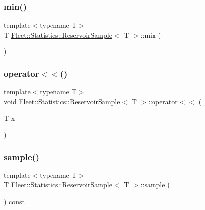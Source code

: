 \subsubsection{\texorpdfstring{min()}{min()}}
{\footnotesize\ttfamily template$<$typename T$>$ \\
T \hyperlink{class_fleet_1_1_statistics_1_1_reservoir_sample}{Fleet\+::\+Statistics\+::\+Reservoir\+Sample}$<$ T $>$\+::min (\begin{DoxyParamCaption}{ }\end{DoxyParamCaption})\hspace{0.3cm}{\ttfamily [inline]}}

\mbox{\label{class_fleet_1_1_statistics_1_1_reservoir_sample_ad6e4d50ef1acefce7f5d66013720c1ef}} 
\subsubsection{\texorpdfstring{operator$<$$<$()}{operator<<()}}
{\footnotesize\ttfamily template$<$typename T$>$ \\
void \hyperlink{class_fleet_1_1_statistics_1_1_reservoir_sample}{Fleet\+::\+Statistics\+::\+Reservoir\+Sample}$<$ T $>$\+::operator$<$$<$ (\begin{DoxyParamCaption}\item[{T}]{x }\end{DoxyParamCaption})\hspace{0.3cm}{\ttfamily [inline]}}

\mbox{\label{class_fleet_1_1_statistics_1_1_reservoir_sample_a1b66a8f27512ebd6a48370621a43db87}} 
\subsubsection{\texorpdfstring{sample()}{sample()}}
{\footnotesize\ttfamily template$<$typename T$>$ \\
T \hyperlink{class_fleet_1_1_statistics_1_1_reservoir_sample}{Fleet\+::\+Statistics\+::\+Reservoir\+Sample}$<$ T $>$\+::sample (\begin{DoxyParamCaption}{ }\end{DoxyParamCaption}) const\hspace{0.3cm}{\ttfamily [inline]}}

